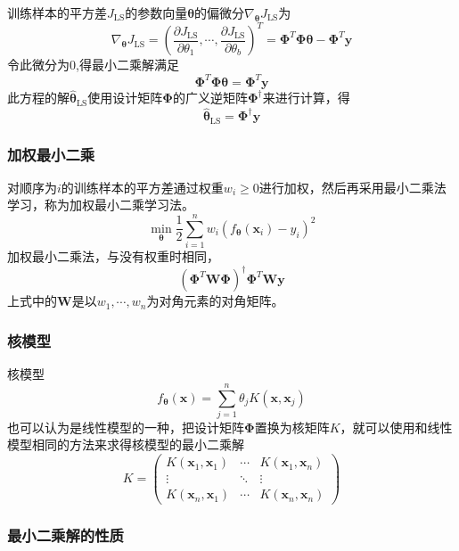 \documentclass{beamer}
\newcommand{\tmmathbf}[1]{\ensuremath{\boldsymbol{#1}}}
\newcommand{\tmop}[1]{\ensuremath{\operatorname{#1}}}
\begin{document}
\begin{CJK*}{UTF8}{gbsn}
{{\begin{frame}
  训练样本的平方差$J_{\tmop{LS}}$的参数向量$\tmmathbf{\theta}$的偏微分$\nabla_{\tmmathbf{\theta}}
  J_{\tmop{LS}}$为
  \[ \nabla_{\tmmathbf{\theta}} J_{\tmop{LS}} = \left( \frac{\partial
     J_{\tmop{LS}}}{\partial \theta_1}, \cdots, \frac{\partial
     J_{\tmop{LS}}}{\partial \theta_b} \right)^T =\tmmathbf{\Phi}^T
     \tmmathbf{\Phi}\tmmathbf{\theta}-\tmmathbf{\Phi}^T \tmmathbf{y} \]
  令此微分为0,得最小二乘解满足
  \[ \tmmathbf{\Phi}^T \tmmathbf{\Phi}\tmmathbf{\theta}=\tmmathbf{\Phi}^T
     \tmmathbf{y} \]
  此方程的解$\hat{\tmmathbf{\theta}}_{\tmop{LS}}$使用设计矩阵$\tmmathbf{\Phi}$的广义逆矩阵$\tmmathbf{\Phi}^{\dag}$来进行计算，得
  \[ \hat{\tmmathbf{\theta}}_{\tmop{LS}} =\tmmathbf{\Phi}^{\dag} \tmmathbf{y}
  \]
\end{frame}}{\begin{frame}
  \frametitle{加权最小二乘}
  
  对顺序为$i$的训练样本的平方差通过权重$w_i \geqslant
  0$进行加权，然后再采用最小二乘法学习，称为加权最小二乘学习法。
  \[ \min_{\tmmathbf{\theta}} \frac{1}{2} \sum_{i = 1}^n w_i
     (f_{\tmmathbf{\theta}} (\tmmathbf{x}_i) - y_i)^2 \]
  加权最小二乘法，与没有权重时相同，
  \[ (\tmmathbf{\Phi}^T \tmmathbf{W}\tmmathbf{\Phi})^{\dag} \tmmathbf{\Phi}^T
     \tmmathbf{W}\tmmathbf{y} \]
  上式中的$\tmmathbf{W}$是以$w_1, \cdots,
  w_n$为对角元素的对角矩阵。
\end{frame}}{\begin{frame}
  \frametitle{核模型}
  
  核模型
  \[ f_{\tmmathbf{\theta}} (\tmmathbf{x}) = \sum_{j = 1}^n \theta_j K
     (\tmmathbf{x}, \tmmathbf{x}_j) \]
  也可以认为是线性模型的一种，把设计矩阵$\tmmathbf{\Phi}$置换为核矩阵$K$，就可以使用和线性模型相同的方法来求得核模型的最小二乘解
  \[ K = \left(\begin{array}{ccc}
       K (\tmmathbf{x}_1, \tmmathbf{x}_1) & \cdots & K (\tmmathbf{x}_1,
       \tmmathbf{x}_n)\\
       \vdots & \ddots & \vdots\\
       K (\tmmathbf{x}_n, \tmmathbf{x}_1) & \cdots & K (\tmmathbf{x}_n,
       \tmmathbf{x}_n)
     \end{array}\right) \]
  
\end{frame}}{\begin{frame}
  \frametitle{最小二乘解的性质}
  

\end{frame}}}
\end{CJK*}
\end{document}

